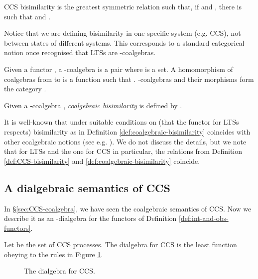 \documentclass[orivec]{llncs}
\newcommand{\defend}{}
\renewenvironment{definition}{\begin{defn}}{\defend\end{defn}}
\begin{document}
\begin{definition}\label{def:CCS-bisimilarity} CCS bisimilarity is the greatest symmetric relation  such that, if  and , there is  such that  and . 
\end{definition}

Notice that we are defining bisimilarity in one specific system (e.g. CCS), not between states of different systems. This corresponds to a standard categorical notion once recognised that LTSs are -coalgebras.

\begin{definition}
	Given a functor , a -coalgebra is a pair  where  is a set. A homomorphism of coalgebras from  to  is a function  such that . -coalgebras and their morphisms form the category .
\end{definition}

\begin{definition}\label{def:coalgebraic-bisimilarity}
	Given a -coalgebra , \emph{coalgebraic bisimilarity}  is defined by . 
\end{definition}

It is well-known that under suitable conditions on  (that the functor for LTSs respects) bisimilarity as in Definition \ref{def:coalgebraic-bisimilarity} coincides with other coalgebraic notions (see e.g. \cite{Sta11}). We do not discuss the details, but we note that for LTSs and the one for CCS in particular, the relations from Definition \ref{def:CCS-bisimilarity} and \ref{def:coalgebraic-bisimilarity} coincide.

\subsection{A dialgebraic semantics of CCS}
\label{sec:CCS-dialgebra}

In \S \ref{sec:CCS-coalgebra}, we have seen the coalgebraic semantics of CCS.
Now we describe it as an -dialgebra for the functors of Definition \ref{def:int-and-obs-functors}.

\begin{definition}\label{def:CCS-dialgebra}
Let  be the set of CCS processes. The dialgebra  for CCS is the least function obeying to the rules in Figure \ref{fig:CCS-dialgebra}.
\end{definition}

\begin{figure}
\begin{scriptsize}
 \begin{centering}
              
              
     
  \end{centering}
\end{scriptsize}
\caption{The dialgebra for CCS.}\label{fig:CCS-dialgebra}
\end{figure}
	
\end{document}
